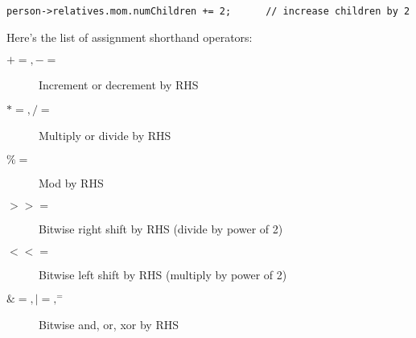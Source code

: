\begin{lstlisting}
person->relatives.mom.numChildren += 2;      // increase children by 2
\end{lstlisting}

Here's the list of assignment shorthand operators:

\begin{description}
\item[$+=, -=$] Increment or decrement by RHS
\item[$*=, /=$] Multiply or divide by RHS
\item[$\%=$] Mod by RHS
\item[$>>=$] Bitwise right shift by RHS (divide by power of 2)
\item[$<<=$] Bitwise left shift by RHS (multiply by power of 2)
\item[$\&=, |=, ^=$] Bitwise and, or, xor by RHS
\end{description}

